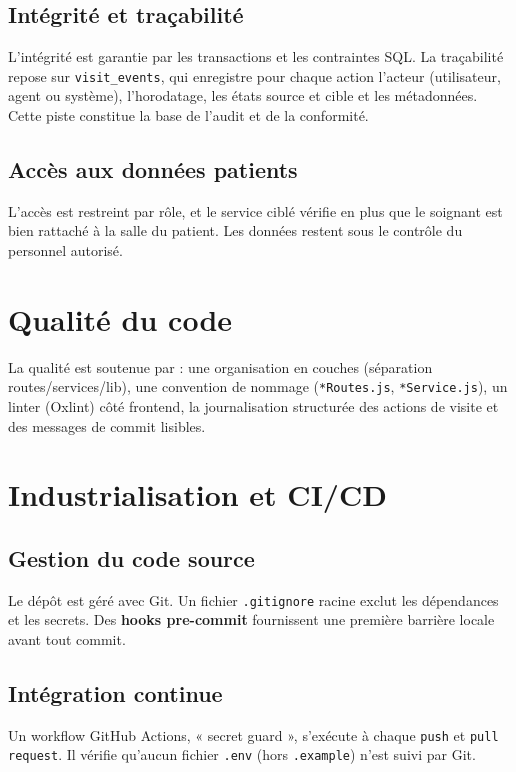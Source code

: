 \subsection{Intégrité et traçabilité}

L'intégrité est garantie par les transactions et les contraintes SQL. La traçabilité repose sur \texttt{visit\_events}, qui enregistre pour chaque action l'acteur (utilisateur, agent ou système), l'horodatage, les états source et cible et les métadonnées. Cette piste constitue la base de l'audit et de la conformité.

\subsection{Accès aux données patients}

L'accès est restreint par rôle, et le service ciblé vérifie en plus que le soignant est bien rattaché à la salle du patient. Les données restent sous le contrôle du personnel autorisé.

\section{Qualité du code}

La qualité est soutenue par : une organisation en couches (séparation routes/services/lib), une convention de nommage (\texttt{*Routes.js}, \texttt{*Service.js}), un linter (Oxlint) côté frontend, la journalisation structurée des actions de visite et des messages de commit lisibles.

\section{Industrialisation et CI/CD}

\subsection{Gestion du code source}

Le dépôt est géré avec Git. Un fichier \texttt{.gitignore} racine exclut les dépendances et les secrets. Des \textbf{hooks pre-commit} fournissent une première barrière locale avant tout commit.

\subsection{Intégration continue}

Un workflow GitHub Actions, « secret guard », s'exécute à chaque \texttt{push} et \texttt{pull request}. Il vérifie qu'aucun fichier \texttt{.env} (hors \texttt{.example}) n'est suivi par Git.

